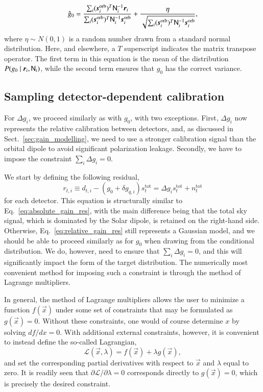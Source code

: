 \documentclass[twocolumn]{aa}
\newcommand{\N}[0]{\tens{N}}
\renewcommand{\r}[0]{\vec{r}}
\newcommand{\x}[0]{\vec{x}}
\begin{document}
\begin{equation}
    \hat{g}_0 = \frac{\sum_i (\vec{s}_i^{\mathrm{orb}})^T\N^{-1}_i\vec{r}_i}{\sum_i (\vec{s}_i^{\mathrm{orb}})^T\N_i^{-1}\vec{s}_i^{\mathrm{orb}}} + \frac{\eta}{\sqrt{\sum_i(\vec{s}_i^{\mathrm{orb}})^T\N_i^{-1}\vec{s}_i^{\mathrm{orb}}}},
    \label{eq:absolute_gain_sampling}
\end{equation}
where $\eta\sim N(0,1)$ is a random number drawn from a standard
normal distribution. Here, and elsewhere, a $T$ superscript indicates
the matrix transpose operator. The first term in this equation is the mean of
the distribution $P(g_0\mid\r_i, \N_i)$, while the second term ensures that
$g_0$ has the correct variance.

\subsection{Sampling detector-dependent calibration}
\label{sec:delta_gi_sampling}
For $\Delta g_i$, we proceed similarly as with $g_0$, with two
exceptions. First, $\Delta g_i$ now represents the relative
calibration between detectors, and, as discussed in
Sect.~\ref{sec:gain_modelling}, we need to use a stronger calibration
signal than the orbital dipole to avoid significant polarization
leakage. Secondly, we have to impose the constraint $\sum_i \Delta g_i
= 0$.

We start by defining the following residual,
\begin{equation}
    r_{t,i} \equiv d_{t,i} - (g_0 + \delta{g}_{q,i})s_t^{\mathrm{tot}} = \Delta g_i s_t^{\mathrm{tot}} + n_t^{\mathrm{tot}}
    \label{eq:relative_gain_res}
\end{equation}
for each detector. This equation is structurally similar to
Eq.~\eqref{eq:absolute_gain_res}, with the main difference being that
the total sky signal, which is dominated by the Solar dipole, is
retained on the right-hand side. Otherwise,
Eq.~\eqref{eq:relative_gain_res} still represents a Gaussian model,
and we should be able to proceed similarly as for $g_0$ when drawing
from the conditional distribution. We do, however, need to ensure that
$\sum_i \Delta g_i=0$, and this will significantly impact the form of
the target distribution. The numerically most convenient method for
imposing such a constraint is through the method of Lagrange
multipliers.


In general, the method of Lagrange multipliers allows the user to
minimize a function $f(\x)$ under some set of constraints that may be
formulated as $g(\x) = 0$. Without these constraints, one would of
course determine $x$ by solving $df/dx=0$. With additional
external constraints, however, it is convenient to instead define the
so-called Lagrangian,
\begin{equation}
    \mathcal{L}(\x, \lambda) = f(\x) + \lambda g(\x),
    \label{eq:lagrangian}
\end{equation}
and set the corresponding partial derivatives with
respect to $\x$ and $\lambda$ equal to zero. It is readily seen that
$\partial\mathcal{L}/\partial \lambda = 0$ corresponds
directly to $g(\x) = 0$, which is precisely the desired
constraint.
\end{document}
